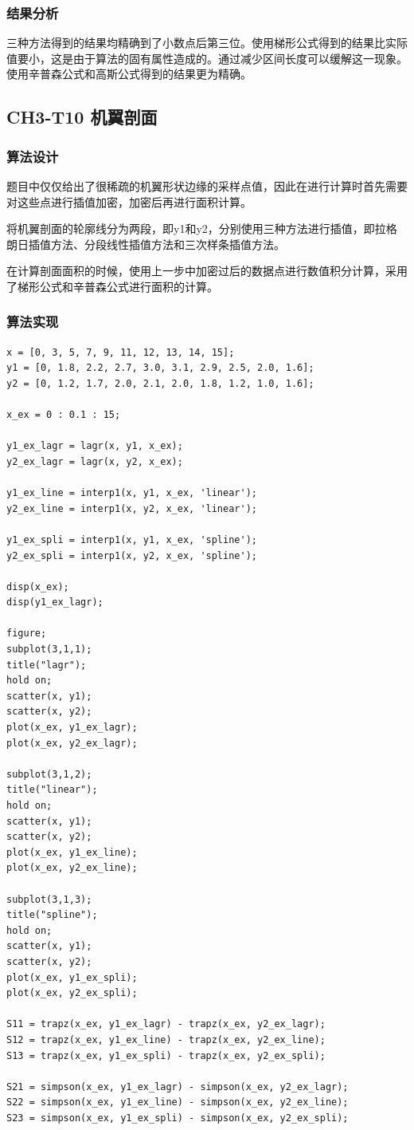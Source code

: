 \documentclass{article}
\begin{document}
\subsubsection{结果分析}
三种方法得到的结果均精确到了小数点后第三位。使用梯形公式得到的结果比实际值要小，这是由于算法的固有属性造成的。通过减少区间长度可以缓解这一现象。使用辛普森公式和高斯公式得到的结果更为精确。

\subsection{CH3-T10 机翼剖面}
\subsubsection{算法设计}
题目中仅仅给出了很稀疏的机翼形状边缘的采样点值，因此在进行计算时首先需要对这些点进行插值加密，加密后再进行面积计算。

将机翼剖面的轮廓线分为两段，即y1和y2，分别使用三种方法进行插值，即拉格朗日插值方法、分段线性插值方法和三次样条插值方法。

在计算剖面面积的时候，使用上一步中加密过后的数据点进行数值积分计算，采用了梯形公式和辛普森公式进行面积的计算。
\subsubsection{算法实现}
\begin{lstlisting}
x = [0, 3, 5, 7, 9, 11, 12, 13, 14, 15];
y1 = [0, 1.8, 2.2, 2.7, 3.0, 3.1, 2.9, 2.5, 2.0, 1.6];
y2 = [0, 1.2, 1.7, 2.0, 2.1, 2.0, 1.8, 1.2, 1.0, 1.6];

x_ex = 0 : 0.1 : 15;

y1_ex_lagr = lagr(x, y1, x_ex);
y2_ex_lagr = lagr(x, y2, x_ex);

y1_ex_line = interp1(x, y1, x_ex, 'linear');
y2_ex_line = interp1(x, y2, x_ex, 'linear');

y1_ex_spli = interp1(x, y1, x_ex, 'spline');
y2_ex_spli = interp1(x, y2, x_ex, 'spline');

disp(x_ex);
disp(y1_ex_lagr);

figure;
subplot(3,1,1);
title("lagr");
hold on;
scatter(x, y1);
scatter(x, y2);
plot(x_ex, y1_ex_lagr);
plot(x_ex, y2_ex_lagr);

subplot(3,1,2);
title("linear");
hold on;
scatter(x, y1);
scatter(x, y2);
plot(x_ex, y1_ex_line);
plot(x_ex, y2_ex_line);

subplot(3,1,3);
title("spline");
hold on;
scatter(x, y1);
scatter(x, y2);
plot(x_ex, y1_ex_spli);
plot(x_ex, y2_ex_spli);

S11 = trapz(x_ex, y1_ex_lagr) - trapz(x_ex, y2_ex_lagr);
S12 = trapz(x_ex, y1_ex_line) - trapz(x_ex, y2_ex_line);
S13 = trapz(x_ex, y1_ex_spli) - trapz(x_ex, y2_ex_spli);

S21 = simpson(x_ex, y1_ex_lagr) - simpson(x_ex, y2_ex_lagr);
S22 = simpson(x_ex, y1_ex_line) - simpson(x_ex, y2_ex_line);
S23 = simpson(x_ex, y1_ex_spli) - simpson(x_ex, y2_ex_spli);

\end{lstlisting}
\end{document}
